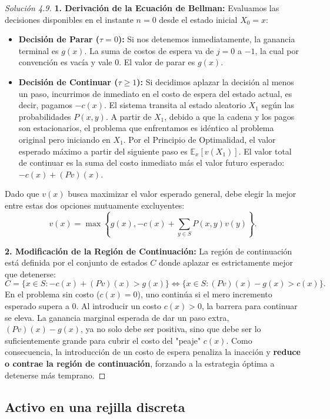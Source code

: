 \documentclass[10pt,a4paper]{article}
\begin{document}
\begin{proof}[Solución 4.9]
    \textbf{1. Derivación de la Ecuación de Bellman:}
    Evaluamos las decisiones disponibles en el instante $n=0$ desde el estado inicial $X_0 = x$:
    \begin{itemize}
        \item \textbf{Decisión de Parar ($\tau = 0$):} Si nos detenemos inmediatamente, la ganancia terminal es $g(x)$. La suma de costos de espera va de $j=0$ a $-1$, la cual por convención es vacía y vale $0$. El valor de parar es $g(x)$.
        \item \textbf{Decisión de Continuar ($\tau \ge 1$):} Si decidimos aplazar la decisión al menos un paso, incurrimos de inmediato en el costo de espera del estado actual, es decir, pagamos $-c(x)$. 
        El sistema transita al estado aleatorio $X_1$ según las probabilidades $P(x,y)$. A partir de $X_1$, debido a que la cadena y los pagos son estacionarios, el problema que enfrentamos es idéntico al problema original pero iniciando en $X_1$. Por el Principio de Optimalidad, el valor esperado máximo a partir del siguiente paso es $\mathbb{E}_x[v(X_1)]$.
        El valor total de continuar es la suma del costo inmediato más el valor futuro esperado: $-c(x) + (Pv)(x)$.
    \end{itemize}
    Dado que $v(x)$ busca maximizar el valor esperado general, debe elegir la mejor entre estas dos opciones mutuamente excluyentes:
    \[ v(x) = \max \left\{ g(x), -c(x) + \sum_{y \in S} P(x,y)v(y) \right\}. \]

    \textbf{2. Modificación de la Región de Continuación:}
    La región de continuación está definida por el conjunto de estados $C$ donde aplazar es estrictamente mejor que detenerse:
    \[ C = \{ x \in S : -c(x) + (Pv)(x) > g(x) \} \iff \{ x \in S : (Pv)(x) - g(x) > c(x) \}. \]
    En el problema sin costo ($c(x)=0$), uno continúa si el mero incremento esperado supera a 0. Al introducir un costo $c(x) > 0$, la barrera para continuar se eleva. La ganancia marginal esperada de dar un paso extra, $(Pv)(x) - g(x)$, ya no solo debe ser positiva, sino que debe ser lo suficientemente grande para cubrir el costo del "peaje" $c(x)$. Como consecuencia, la introducción de un costo de espera penaliza la inacción y \textbf{reduce o contrae la región de continuación}, forzando a la estrategia óptima a detenerse más temprano.
\end{proof}

\newpage
\subsection{Activo en una rejilla discreta}
\end{document}
